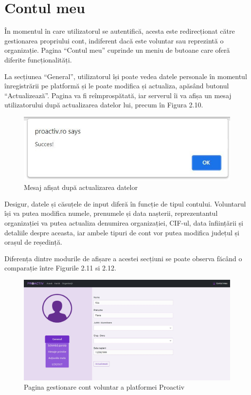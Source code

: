 \documentclass[12pt,a4paper]{report}
\begin{document}
\section{Contul meu}
\par
În momentul în care utilizatorul se autentifică, acesta este redirecționat către gestionarea propriului cont, indiferent dacă este voluntar sau reprezintă o organizație. Pagina “Contul meu” cuprinde un meniu de butoane care oferă diferite funcționalități. 
\\\par
La secțiunea “General”, utilizatorul își poate vedea datele personale în momentul înregistrării pe platformă și le poate modifica și actualiza, apăsând butonul “Actualizează”. Pagina va fi reîmprospătată, iar serverul îi va afișa un mesaj utilizatorului după actualizarea datelor lui, precum în Figura 2.10.
\\
\begin{figure}[H]
\centering
  \includegraphics[width=0.5\linewidth]{./imagini/succes.jpg}
  \caption{Mesaj afișat după actualizarea datelor}
\end{figure}
\par
Desigur, datele și căsuțele de input diferă în funcție de tipul contului. Voluntarul își va putea modifica numele, prenumele și data nașterii, reprezentantul organizației va putea actualiza denumirea organizației, CIF-ul, data înființării și detaliile despre aceasta, iar ambele tipuri de cont vor putea modifica județul și orașul de reședință.
\\\par
Diferența dintre modurile de afișare a acestei secțiuni se poate observa făcând o comparație între Figurile 2.11 si 2.12.
\\
\begin{figure}[H]
\centering
  \includegraphics[width=1\linewidth]{./imagini/cont1.jpg}
  \caption{Pagina gestionare cont voluntar a platformei Proactiv}
\end{figure}
\end{document}
